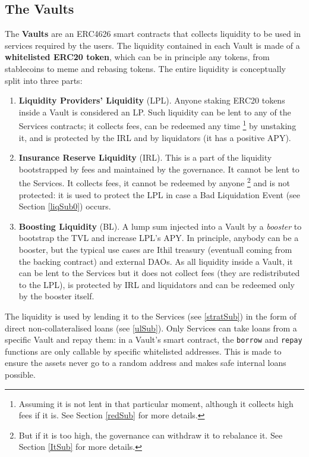 \documentclass[a4paper,10 pt]{article}
\theoremstyle{definition}
\begin{document}
\subsection{The Vaults}\label{vaultSub}
The {\bf Vaults} are an ERC4626 smart contracts that collects liquidity to be used in services required by the users. The liquidity contained in each Vault is made of a {\bf whitelisted ERC20 token}, which can be in principle any tokens, from stablecoins to meme and rebasing tokens. The entire liquidity is conceptually split into three parts:
\begin{enumerate}
\item {\bf Liquidity Providers' Liquidity} (LPL). Anyone staking ERC20 tokens inside a Vault is considered an LP. Such liquidity can be lent to any of the Services contracts; it collects fees, can be redeemed any time \footnote{Assuming it is not lent in that particular moment, although it collects high fees if it is. See Section \ref{redSub} for more details.} by unstaking it, and is protected by the IRL and by liquidators (it has a positive APY).
\item {\bf Insurance Reserve Liquidity} (IRL). This is a part of the liquidity bootstrapped by fees and maintained by the governance. It cannot be lent to the Services. It collects fees, it cannot be redeemed by anyone \footnote{But if it is too high, the governance can withdraw it to rebalance it. See Section \ref{ItSub} for more details.} and is not protected: it is used to protect the LPL in case a Bad Liquidation Event (see Section \ref{liqSub0}) occurs.
\item {\bf Boosting Liquidity} (BL). A lump sum injected into a Vault by a {\it booster} to bootstrap the TVL and increase LPL's APY. In principle, anybody can be a booster, but the typical use cases are Ithil treasury (eventuall coming from the backing contract) and external DAOs. As all liquidity inside a Vault, it can be lent to the Services but it does not collect fees (they are redistributed to the LPL), is protected by IRL and liquidators and can be redeemed only by the booster itself.
\end{enumerate}

The liquidity is used by lending it to the Services (see \ref{stratSub}) in the form of direct non-collateralised loans (see \ref{ulSub}). Only Services can take loans from a specific Vault and repay them: in a Vault's smart contract, the \verb|borrow| and \verb|repay| functions are only callable by specific whitelisted addresses. This is made to ensure the assets never go to a random address and makes safe internal loans possible.
\end{document}
